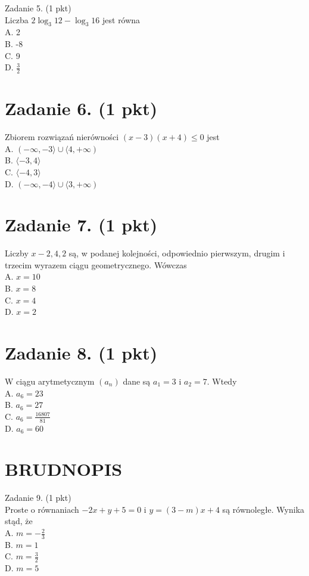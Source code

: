 \documentclass[10pt]{article}
\begin{document}
Zadanie 5. (1 pkt)\\
Liczba \(2 \log _{3} 12-\log _{3} 16\) jest równa\\
A. 2\\
B. -8\\
C. 9\\
D. \(\frac{3}{2}\)

\section*{Zadanie 6. (1 pkt)}
Zbiorem rozwiązań nierówności \((x-3)(x+4) \leq 0\) jest\\
A. \((-\infty,-3\rangle \cup\langle 4,+\infty)\)\\
B. \(\langle-3,4\rangle\)\\
C. \(\langle-4,3\rangle\)\\
D. \((-\infty,-4\rangle \cup\langle 3,+\infty)\)

\section*{Zadanie 7. (1 pkt)}
Liczby \(x-2,4,2\) są, w podanej kolejności, odpowiednio pierwszym, drugim i trzecim wyrazem ciągu geometrycznego. Wówczas\\
A. \(x=10\)\\
B. \(x=8\)\\
C. \(x=4\)\\
D. \(x=2\)

\section*{Zadanie 8. (1 pkt)}
W ciągu arytmetycznym \(\left(a_{n}\right)\) dane są \(a_{1}=3\) i \(a_{2}=7\). Wtedy\\
A. \(a_{6}=23\)\\
B. \(a_{6}=27\)\\
C. \(a_{6}=\frac{16807}{81}\)\\
D. \(a_{6}=60\)

\section*{BRUDNOPIS}
Zadanie 9. (1 pkt)\\
Proste o równaniach \(-2 x+y+5=0\) i \(y=(3-m) x+4\) są równoległe. Wynika stąd, że\\
A. \(m=-\frac{2}{3}\)\\
B. \(m=1\)\\
C. \(m=\frac{3}{2}\)\\
D. \(m=5\)
\end{document}
